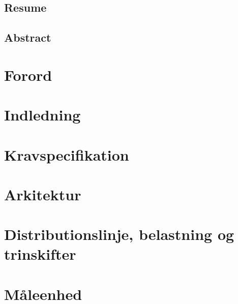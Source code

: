 \documentclass[a4paper, 11pt,oneside,openany, danish]{memoir} %
\begin{document}

\frontmatter

             
\section{Resume}
\section{Abstract}



\tableofcontents

\mainmatter
\chapter{Forord}  
                     
\chapter{Indledning}

\chapter{Kravspecifikation}




\chapter{Arkitektur}




\chapter{Distributionslinje, belastning og trinskifter}





\chapter{Måleenhed}









\end{document}
